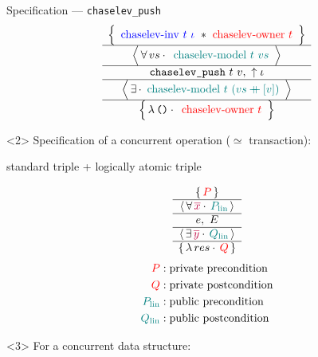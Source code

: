 \begin{frame}{Specification --- \texttt{chaselev\_push}}
\centering
\[
	\atripleExtPretty{
		\tikz[baseline, remember picture]{\node[anchor=base] (inv_1) {${
			\textcolor{blue}{\mathrm{chaselev \mathhyphen inv}\ t\ \iota}
		}$}} \iSep
		\tikz[baseline, remember picture]{\node[anchor=base] (owner_1) {${
			\textcolor{red}{\mathrm{chaselev \mathhyphen owner}\ t}
		}$}}
	}{
		vs
	}{
		\tikz[baseline, remember picture]{\node[anchor=base] (model_1) {${
			\textcolor{teal}{\mathrm{chaselev \mathhyphen model}\ t\ vs}
		}$}}
	}{
		\texttt{chaselev\_push}\ t\ v
	}{
		\uparrow\iota
	}{
	}{
		\tikz[baseline, remember picture]{\node[anchor=base] (model_2) {${
			\textcolor{teal}{\mathrm{chaselev \mathhyphen model}\ t\ (vs \mdoubleplus [v])}
		}$}}
	}{
		\exprUnit
	}{
		\tikz[baseline, remember picture]{\node[anchor=base] (owner_2) {${
			\textcolor{red}{\mathrm{chaselev \mathhyphen owner}\ t}
		}$}}
	}
\]
\begin{overbox}<2>
	\small
	\centering
	Specification of a concurrent operation ($\simeq$ transaction):
	
	standard triple + logically atomic triple
	
	\[
		\atripleExtPretty{
			\textcolor{red}{P}
		}{
			\textcolor{purple}{\overline{x}}
		}{
			\textcolor{teal}{P_\mathrm{lin}}
		}{
			e
		}{
			E
		}{
			\textcolor{purple}{\overline{y}}
		}{
			\textcolor{teal}{Q_\mathrm{lin}}
		}{
			res
		}{
			\textcolor{red}{Q}
		}
	\]
	\begin{align*}
			\textcolor{red}{P}
			&:
			\text{private precondition}
		\\
			\textcolor{red}{Q}
			&:
			\text{private postcondition}
		\\
			\textcolor{teal}{P_\mathrm{lin}}
			&:
			\text{public precondition}
		\\
			\textcolor{teal}{Q_\mathrm{lin}}
			&:
			\text{public postcondition}
	\end{align*}
\end{overbox}
\begin{overbox}<3>
	For a concurrent data structure:
	

\end{overbox}
\end{frame}
